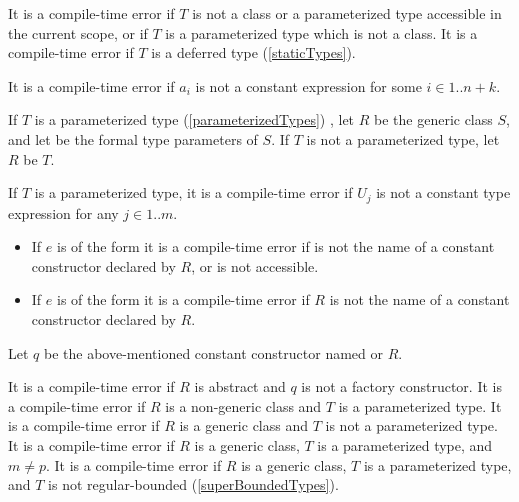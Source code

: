 \documentclass[makeidx]{article}
\begin{document}
{\LMHash{}%
It is a compile-time error if $T$ is not
a class or a parameterized type accessible in the current scope,
or if $T$ is a parameterized type which is not a class.
It is a compile-time error if $T$ is a deferred type
(\ref{staticTypes}).

\LMHash{}%
It is a compile-time error if $a_i$ is not a constant expression
for some $i \in 1 .. n + k$.

\LMHash{}%
If $T$ is a parameterized type (\ref{parameterizedTypes})
,
let $R$ be the generic class $S$,
and let
be the formal type parameters of $S$.
If $T$ is not a parameterized type, let $R$ be $T$.

\LMHash{}%
If $T$ is a parameterized type,
it is a compile-time error if $U_j$ is not a constant type expression for any
$j \in 1 .. m$.

\begin{itemize}
\item
  If $e$ is of the form
  it is a compile-time error if  is not the name of
  a constant constructor declared by $R$, or \id{} is not accessible.
\item
  If $e$ is of the form
  it is a compile-time error if $R$ is not the name of
  a constant constructor declared by $R$.
\end{itemize}

\LMHash{}%
Let $q$ be the above-mentioned constant constructor named  or $R$.

\LMHash{}%
It is a compile-time error if $R$ is abstract
and $q$ is not a factory constructor.
It is a compile-time error if $R$ is a non-generic class
and $T$ is a parameterized type.
It is a compile-time error if $R$ is a generic class
and $T$ is not a parameterized type.
It is a compile-time error if $R$ is a generic class,
$T$ is a parameterized type, and $m \not= p$.
It is a compile-time error if $R$ is a generic class,
$T$ is a parameterized type,
and $T$ is not regular-bounded
(\ref{superBoundedTypes}).

}
\end{document}
